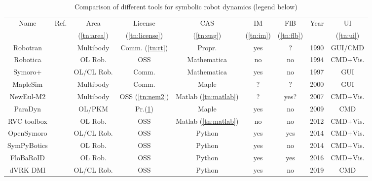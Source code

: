 \documentclass[runningheads]{llncs}
\newcommand{\ok}{{yes}}
\newcommand{\no}{{no}}
\begin{document}
\begin{table}[b!] %
	\vspace{-0.1cm}
	\caption{Comparison of different tools for symbolic robot dynamics (legend below)}
	\vspace{-0.3cm}
	\label{tab:comparison}
	\centering
	\begin{tabular}[t]{|c|c|c|c|c|c|c|c|c|}
		\hline
		Name & Ref. & Area & License & CAS & IM  & FlB & Year & UI \\
		&&\tabnote{}\label{tn:area} (\ref{tn:area})&\tabnote{}\label{tn:license} (\ref{tn:license})&\tabnote{}\label{tn:eng} (\ref{tn:eng})&\tabnote{}\label{tn:im} (\ref{tn:im})&\tabnote{}\label{tn:flb} (\ref{tn:flb})&&\tabnote{}\label{tn:ui} (\ref{tn:ui})\\
		\hline
		Robotran & \cite{Docquier2013} & Multibody & Comm.\tabnote{}\label{tn:rt} (\ref{tn:rt}) & Propr. & \ok & ? & 1990 & GUI/CMD \\
		\hline
		Robotica & \cite{NetherySpo1994} & OL Rob. & OSS & Mathematica & \no & \no & 1994 & CMD+Vis. \\
		\hline
		Symoro+ & \cite{KhalilCre1997} & OL/CL Rob. & Comm. & Mathematica & \ok & \no & 1997 & GUI \\
		\hline
		MapleSim & \cite{MapleSim} & Multibody & Comm. & Maple & ? & ? & 2000 & GUI \\
		\hline
		NewEul-M2 & \cite{KurzEbeHenSch2010} & Multibody & OSS \tabnote{}\label{tn:nem2}(\ref{tn:nem2}) & Matlab\tabnote{}\label{tn:matlab} (\ref{tn:matlab}) & ? & \ok? & 2007 & CMD+Vis. \\
		\hline
		ParaDyn & \cite{DoThanhKotHeiOrt2009b} & OL/PKM & Pr.\tabnote{}\label{tn:pd} (\ref{tn:pd}) & Maple & \ok & \no & 2009 & CMD \\
		\hline
		RVC toolbox & \cite{Corke2011} & OL Rob. & OSS & Matlab (\ref{tn:matlab}) & \no & \no & 2012 & CMD+Vis. \\
		\hline
		OpenSymoro & \cite{KhalilVijKhoMuk2014} & OL/CL Rob. & OSS & Python & \ok & \ok & 2014 & CMD+Vis. \\
		\hline
		SymPyBotics & \cite{SousaCor2012} & OL Rob. & OSS & Python & \ok & \no & 2014 & CMD+Vis. \\
		\hline
		FloBaRoID & \cite{BethgeMalTsaCal2017} & OL Rob. & OSS & Python & \ok & \ok & 2016 & CMD+Vis. \\
		\hline
		dVRK DMI & \cite{WangGonMunFis2019} & OL/CL Rob. & OSS & Python & \ok & \no & 2019 & CMD \\

\end{tabular}
\end{table}
\end{document}
